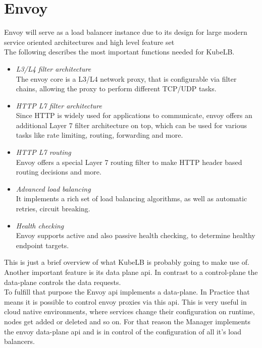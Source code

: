 \section{Envoy}\label{sec:envoy}

Envoy will serve as a load balancer instance due to its design for large modern service oriented architectures and high level feature set
\\
The following describes the most important functions needed for KubeLB.

\begin{itemize}
    \item \textit{L3/L4 filter architecture} \\
    The envoy core is a L3/L4 network proxy, that is configurable via filter chains, allowing the proxy to perform different TCP/UDP tasks.
    \item \textit{HTTP L7 filter architecture} \\
    Since HTTP is widely used for applications to communicate, envoy offers an additional Layer 7 filter architecture on top, which can be used for various tasks like rate limiting, routing, forwarding and more.
    \item \textit{HTTP L7 routing} \\
    Envoy offers a special Layer 7 routing filter to make HTTP header based routing decisions and more.
    \item \textit{Advanced load balancing} \\
    It implements a rich set of load balancing algorithms, as well as automatic retries, circuit breaking.
    \item \textit{Health checking} \\
    Envoy supports active and also passive health checking, to determine healthy endpoint targets.
\end{itemize}

This is just a brief overview of what KubeLB is probably going to make use of.~\cite{WHAT-IS-ENVOY}
\\
Another important feature is its data plane api.
In contrast to a control-plane the data-plane controls the data requests.
\\
To fulfill that purpose the Envoy api implements a data-plane.
In Practice that means it is possible to control envoy proxies via this api.
This is very useful in cloud native environments, where services change their configuration on runtime, nodes get added or deleted and so on.
For that reason the Manager implements the envoy data-plane api and is in control of the configuration of all it's load balancers.
